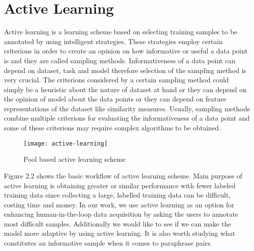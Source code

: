 \section{Active Learning}

Active learning is a learning scheme based on selecting training samples to be annotated by using intelligent strategies. These strategies employ certain criterions in order to create an opinion on how informative or useful a data point is and they are called sampling methods. Informativeness of a data point can depend on dataset, task and model therefore selection of the sampling method is very crucial. The criterions considered by a certain sampling method could simply be a heuristic about the nature of dataset at hand or they can depend on the opinion of model about the data points or they can depend on feature representations of the dataset like similarity measures. Usually, sampling methods combine multiple criterions for evaluating the informativeness of a data point and some of these criterions may require complex algorithms to be obtained. 

\begin{figure}[t]
\texttt{[image: active-learning]}
\centering
\caption{Pool based active learning scheme}
\end{figure}

Figure 2.2 shows the basic workflow of active learning scheme. Main purpose of active learning is obtaining greater or similar performance with fewer labeled training data since collecting a large, labelled training data can be difficult, costing time and money. In our work, we use active learning as an option for enhancing human-in-the-loop data acquisition by asking the users to annotate most difficult samples. Additionally we would like to see if we can make the model more adaptive by using active learning. It is also worth studying what constitutes an informative sample when it comes to paraphrase pairs.